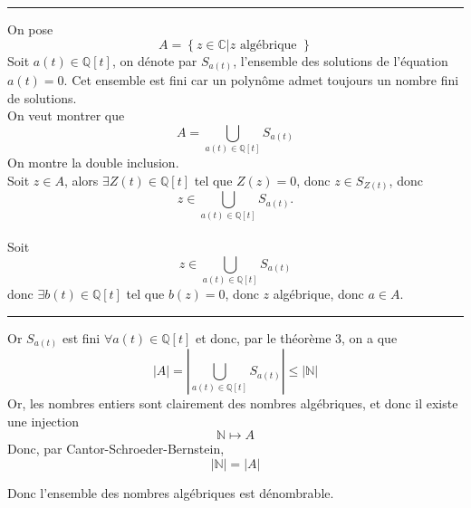 \documentclass[11pt, a4paper, twoside]{article}
\newcommand\hr{
    \noindent\rule[0.5ex]{\linewidth}{0.5pt}\newline
}
\begin{document}
\hr
On pose
\[ 
A = \left\{ z \in \mathbb{C} | z \text{ algébrique }  \right\}
\]
Soit $a(t) \in \mathbb{Q}[t]$, on dénote par $S_{a(t)}$, l'ensemble des solutions de l'équation $a(t)=0$. Cet ensemble est fini car un polynôme admet toujours un nombre fini de solutions.\\
On veut montrer que 
\[ 
	A = \bigcup_{a(t) \in \mathbb{Q}[t]} S_{a(t)} 
\]
On montre la double inclusion.\\
Soit $z \in A$, alors $\exists Z(t) \in \mathbb{Q}[t]$ tel que $Z(z)=0$, donc $z \in S_{Z(t)} $, donc 
$$z \in \bigcup_{a(t) \in \mathbb{Q}[t]} S_{a(t)}. $$\\
Soit
$$z \in \bigcup_{a(t) \in \mathbb{Q}[t]} S_{a(t)}  $$
donc $\exists b(t) \in \mathbb{Q}[t]$ tel que $b(z)=0$, donc $z$ algébrique, donc $a \in A$.\\
\hr
Or $ S_{a(t)} $ est fini $\forall a(t) \in \mathbb{Q}[t]$ et donc, par le théorème 3, on a que
\[ 
|A| =	|\bigcup_{a(t) \in \mathbb{Q}[t]} S_{a(t)} | \leq |\mathbb{N}|
\]
Or, les nombres entiers sont clairement des nombres algébriques, et donc il existe une injection
\[ 
\mathbb{N} \mapsto A
\]
Donc, par Cantor-Schroeder-Bernstein,
\[ 
|\mathbb{N}| = |A|
\]

Donc l'ensemble des nombres algébriques est dénombrable.
\end{document}
